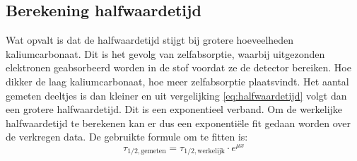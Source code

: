 \documentclass[11pt,a4paper]{article}
\begin{document}
\subsection{Berekening halfwaardetijd}
Wat opvalt is dat de halfwaardetijd stijgt bij grotere hoeveelheden kaliumcarbonaat. Dit is het gevolg van zelfabsorptie, waarbij uitgezonden elektronen geabsorbeerd worden in de stof voordat ze de detector bereiken. Hoe dikker de laag kaliumcarbonaat, hoe meer zelfabsorptie plaatsvindt. Het aantal gemeten deeltjes is dan kleiner en uit vergelijking \ref{eq:halfwaardetijd} volgt dan een grotere halfwaardetijd. Dit is een exponentieel verband. Om de werkelijke halfwaardetijd te berekenen kan er dus een exponentiële fit gedaan worden over de verkregen data. De gebruikte formule om te fitten is:
\begin{equation}
\tau_{1/2, \mathrm{gemeten}} = \tau_{1/2, \mathrm{werkelijk}} \cdot e^{\mu x}
\label{eq:fit_halfwaarde}
\end{equation}
\end{document}
